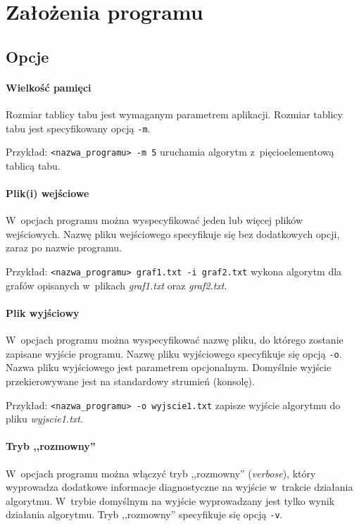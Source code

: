 \section{Założenia programu}

\subsection{Opcje}

\paragraph{Wielkość pamięci}

Rozmiar tablicy tabu jest wymaganym parametrem aplikacji. Rozmiar tablicy tabu jest specyfikowany opcją \verb+-m+. 

Przykład: \verb+<nazwa_programu> -m 5+ uruchamia algorytm z~pięcioelementową tablicą tabu.

\paragraph{Plik(i) wejściowe}

W~opcjach programu można wyspecyfikować jeden lub więcej plików wejściowych. Nazwę pliku wejściowego specyfikuje się bez dodatkowych opcji, zaraz po nazwie programu.

Przykład: \verb+<nazwa_programu> graf1.txt -i graf2.txt+ wykona algorytm dla grafów opisanych w~plikach \emph{graf1.txt} oraz \emph{graf2.txt}.

\paragraph{Plik wyjściowy}

W~opcjach programu można wyspecyfikować nazwę pliku, do którego zostanie zapisane wyjście programu. Nazwę pliku wyjściowego specyfikuje się opcją \verb+-o+. Nazwa pliku wyjściowego jest parametrem opcjonalnym. Domyślnie wyjście przekierowywane jest na standardowy strumień (konsolę).

Przykład: \verb+<nazwa_programu> -o wyjscie1.txt+ zapisze wyjście algorytmu do pliku \emph{wyjscie1.txt}.

\paragraph{Tryb ,,rozmowny''}

W~opcjach programu można włączyć tryb ,,rozmowny'' (\emph{verbose}), który wyprowadza dodatkowe informacje diagnostyczne na wyjście w~trakcie działania algorytmu. W~trybie domyślnym na wyjście wyprowadzany jest tylko wynik działania algorytmu. Tryb ,,rozmowny'' specyfikuje się opcją \verb+-v+.

